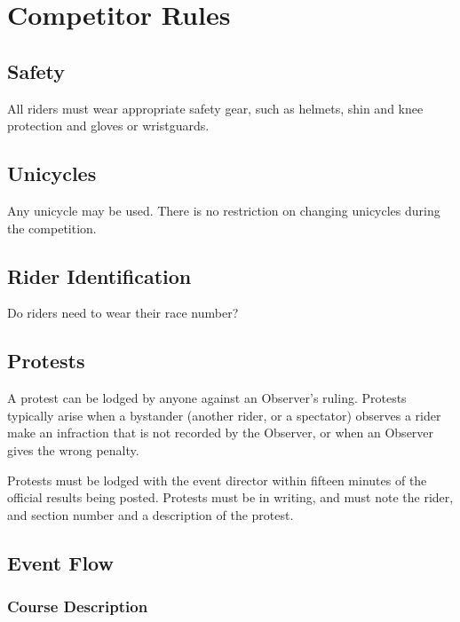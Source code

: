 \chapter{Competitor Rules}

\section{Safety}

All riders must wear appropriate safety gear, such as helmets, shin and knee protection and gloves or wristguards.

\section{Unicycles}

Any unicycle may be used. 
There is no restriction on changing unicycles during the competition.

\section{Rider Identification}

\begin{framed}
Do riders need to wear their race number?
\end{framed}

\section{Protests}

A protest can be lodged by anyone against an Observer's ruling. 
Protests typically arise when a bystander (another rider, or a spectator) observes a rider make an infraction that is not recorded by the Observer, or when an Observer gives the wrong penalty.

Protests must be lodged with the event director within fifteen minutes of the official results being posted. 
Protests must be in writing, and must note the rider, and section number and a description of the protest.


\section{Event Flow}

\subsection{Course Description}


